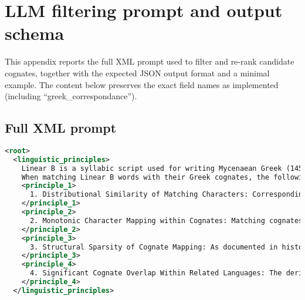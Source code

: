 \section{LLM filtering prompt and output schema}\label{app:llm-filter}

This appendix reports the full XML prompt used to filter and re-rank candidate cognates, together with the expected JSON output format and a minimal example.
The content below preserves the exact field names as implemented (including ``greek\_correspondance'').

\subsection{Full XML prompt}

\begin{lstlisting}[style=mystyle, language=XML, breaklines=true]
<root>
  <linguistic_principles>
    Linear B is a syllabic script used for writing Mycenaean Greek (1450-1200 BCE).
    When matching Linear B words with their Greek cognates, the following fundamental principles of historical linguistics must be observed:
    <principle_1>
      1. Distributional Similarity of Matching Characters: Corresponding characters tend to appear in similar contexts in both languages. Their phonetic environments should show consistent correspondence patterns.
    </principle_1>
    <principle_2>
      2. Monotonic Character Mapping within Cognates: Matching cognates rarely exhibit character reordering. The alignment between Linear B and ancient Greek must preserve the relative ordering of phonemes, with transformations following systematic phonetic rules.
    </principle_2>
    <principle_3>
      3. Structural Sparsity of Cognate Mapping: As documented in historical linguistics, cognate matches are mostly one-to-one, since both words are derived from the same proto-origin. Avoid unjustified many-to-many correspondences.
    </principle_3>
    <principle_4>
      4. Significant Cognate Overlap Within Related Languages: The derived vocabulary mapping should have sufficient coverage for lost language cognates (Linear B). Prioritize correspondences that reinforce systematic patterns already observed.
    </principle_4>
  </linguistic_principles>


\end{lstlisting}
